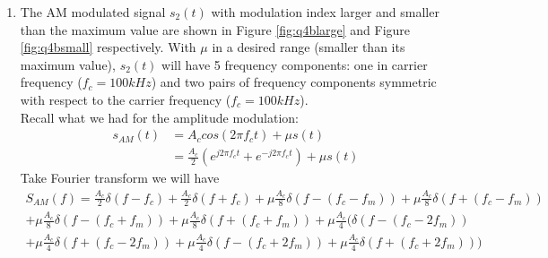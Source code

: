 \documentclass[11pt]{article}
\begin{document}
\begin{enumerate}[label=(\alph*)]
\item %
The AM modulated signal $s_2 (t)$ with modulation index larger and smaller than the maximum value are shown in Figure \ref{fig:q4blarge} and Figure \ref{fig:q4bsmall} respectively. With $\mu$ in a desired range (smaller than its maximum value), $s_2 (t)$ will have 5 frequency components: one in carrier frequency ($f_c=100kHz$) and two pairs of frequency components symmetric with respect to the carrier frequency ($f_c=100kHz$).\\
Recall what we had for the amplitude modulation:
\begin{align*}
    s_{AM}(t)& = A_c cos(2\pi f_c t)+\mu s(t) \\
    &= \frac{A_c}{2} (e^{j2\pi f_c t}+e^{-j2\pi f_c t})+\mu s(t)
\end{align*}
Take Fourier transform we will have
\begin{align*}
    S_{AM}(f) = \frac{A_c}{2} \delta(f-f_c)+\frac{A_c}{2}\delta(f+f_c) +\mu\frac{A_c}{8} \delta (f-(f_c-f_m)) +\mu\frac{A_c}{8}\delta (f+(f_c-f_m)) \\ + \mu\frac{A_c}{8}\delta (f-(f_c+f_m)) + \mu\frac{A_c}{8}\delta (f+(f_c+f_m))
    +\mu\frac{A_c}{4} (\delta (f-(f_c-2f_m)) \\ +\mu\frac{A_c}{4}\delta (f+(f_c-2f_m)) +\mu\frac{A_c}{4}\delta (f-(f_c+2f_m)) +\mu\frac{A_c}{4}\delta (f+(f_c+2f_m)))
\end{align*}


\end{enumerate}
\end{document}
